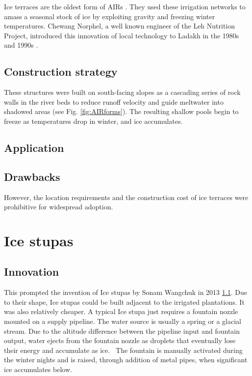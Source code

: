 Ice terraces are the oldest form of AIRs \citep{norphelArtificialGlacierHigh2009}. They used these irrigation
networks to amass a seasonal stock of ice by exploiting gravity and freezing winter temperatures. Chewang
Norphel, a well known engineer of the Leh Nutrition Project, introduced this innovation of local technology to
Ladakh in the 1980s and 1990s \citep{vinceGlacierMan2009}.

\subsection{Construction strategy}

These structures were built on south-facing slopes as a cascading series of rock walls in the river beds to
reduce runoff velocity and guide meltwater into shadowed areas (see Fig. \ref{fig:AIRforms}). The resulting
shallow pools begin to freeze as temperatures drop in winter, and ice accumulates. 

\subsection{Application}

\subsection{Drawbacks}

However, the location requirements and the construction cost of ice terraces were prohibitive for widespread
adoption. 


\section{Ice stupas}

\subsection{Innovation}

This prompted the invention of Ice stupas by Sonam Wangchuk in 2013 \ref{}. Due to their shape, Ice
stupas could be built adjacent to the irrigated plantations. It was also relatively cheaper. A typical Ice stupa
just requires a fountain nozzle mounted on a supply pipeline. The water source is usually a spring or a glacial
stream. Due to the altitude difference between the pipeline input and fountain output, water ejects from the
fountain nozzle as droplets that eventually lose their energy and accumulate as ice.  The fountain is manually
activated during the winter nights and is raised, through addition of metal pipes, when significant ice
accumulates below.

